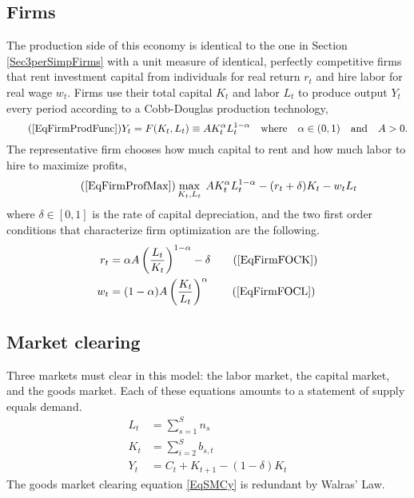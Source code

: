 \documentclass[letterpaper,12pt]{article}
\theoremstyle{definition}
\numberwithin{equation}{section}
\numberwithin{exercise}{section}
\begin{document}
\begin{spacing}{1.5}
   \subsection{Firms}\label{SecSperSimpFirms}

      The production side of this economy is identical to the one in Section \ref{Sec3perSimpFirms} with a unit measure of identical, perfectly competitive firms that rent investment capital from individuals for real return $r_t$ and hire labor for real wage $w_t$. Firms use their total capital $K_t$ and labor $L_t$ to produce output $Y_t$ every period according to a Cobb-Douglas production technology,
      \begin{equation}\tag{\ref{EqFirmProdFunc}}
         Y_t = F(K_t,L_t) \equiv AK_t^\alpha L_t^{1-\alpha}\quad\text{where}\quad \alpha\in(0,1) \quad\text{and}\quad A>0.
      \end{equation}
      The representative firm chooses how much capital to rent and how much labor to hire to maximize profits,
      \begin{equation}\tag{\ref{EqFirmProfMax}}
         \max_{K_t,L_t}\: AK_t^\alpha L_t^{1-\alpha} - (r_t + \delta)K_t - w_t L_t
      \end{equation}
      where $\delta\in[0,1]$ is the rate of capital depreciation, and the two first order conditions that characterize firm optimization are the following.
      \begin{align}
         r_t &= \alpha A\left(\frac{L_t}{K_t}\right)^{1-\alpha} - \delta \tag{\ref{EqFirmFOCK}} \\
         w_t &= (1-\alpha)A\left(\frac{K_t}{L_t}\right)^\alpha \tag{\ref{EqFirmFOCL}}
      \end{align}


   \subsection{Market clearing}\label{SecSperSimpMC}

      Three markets must clear in this model: the labor market, the capital market, and the goods market. Each of these equations amounts to a statement of supply equals demand.
      \begin{align}
         L_t &= \sum_{s=1}^S n_s \label{EqSMCn} \\
         K_t &= \sum_{i=2}^S b_{s,t} \label{EqSMCk} \\
         Y_t &= C_t + K_{t+1} - (1-\delta)K_t \label{EqSMCy}
      \end{align}
      The goods market clearing equation \eqref{EqSMCy} is redundant by Walras' Law.



\end{spacing}
\end{document}
